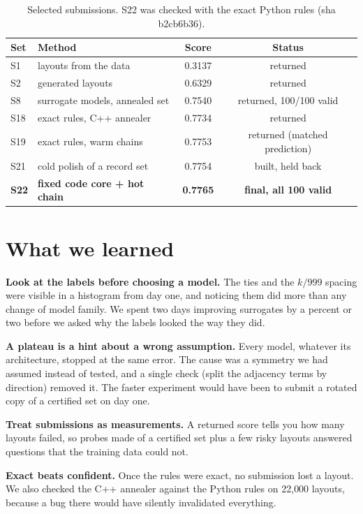 \documentclass[10pt]{article}
\begin{document}
\begin{table}[h]
\centering
\small
\begin{tabular}{llcc}
\toprule
Set & Method & Score & Status \\
\midrule
S1 & layouts from the data & 0.3137 & returned \\
S2 & generated layouts & 0.6329 & returned \\
S8 & surrogate models, annealed set & 0.7540 & returned, 100/100 valid \\
S18 & exact rules, C++ annealer & 0.7734 & returned \\
S19 & exact rules, warm chains & 0.7753 & returned (matched prediction) \\
S21 & cold polish of a record set & 0.7754 & built, held back \\
\textbf{S22} & \textbf{fixed code core + hot chain} & \textbf{0.7765} & \textbf{final, all 100 valid} \\
\bottomrule
\end{tabular}
\caption{Selected submissions. S22 was checked with the exact Python rules (sha b2cb6b36).}
\end{table}

\section{What we learned}

\textbf{Look at the labels before choosing a model.} The ties and the $k/999$ spacing were visible in a histogram from day one, and noticing them did more than any change of model family. We spent two days improving surrogates by a percent or two before we asked why the labels looked the way they did.

\textbf{A plateau is a hint about a wrong assumption.} Every model, whatever its architecture, stopped at the same error. The cause was a symmetry we had assumed instead of tested, and a single check (split the adjacency terms by direction) removed it. The faster experiment would have been to submit a rotated copy of a certified set on day one.

\textbf{Treat submissions as measurements.} A returned score tells you how many layouts failed, so probes made of a certified set plus a few risky layouts answered questions that the training data could not.

\textbf{Exact beats confident.} Once the rules were exact, no submission lost a layout. We also checked the C++ annealer against the Python rules on 22{,}000 layouts, because a bug there would have silently invalidated everything.
\end{document}
